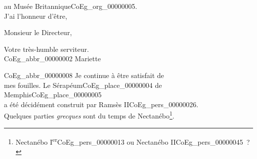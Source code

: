 \documentclass{book}
\begin{document}
au Musée Britannique\gls{CoEg_org_00000005}.\\
\indent J’ai l’honneur d’être,
\begin{center}Monsieur le Directeur,\end{center}
\begin{center}\hspace{5cm}Votre très-humble serviteur.\\
\hspace{5cm}\gls{CoEg_abbr_00000002} Mariette\end{center}
\noindent \gls{CoEg_abbr_00000008} Je continue à être satisfait de\\
mes fouilles. Le Sérapéum\gls{CoEg_place_00000004} de Memphis\gls{CoEg_place_00000005}\\
a été décidément construit par Ramsès II\gls{CoEg_pers_00000026}.\\
Quelques parties \textit{grecques} sont du temps de Nectanébo\footnote{Nectanébo I\textsuperscript{er}\gls{CoEg_pers_00000013} ou Nectanébo II\gls{CoEg_pers_00000045}~?}.

\hypertarget{CoEg_Mariette_1851-09-14a}{}
\end{document}
